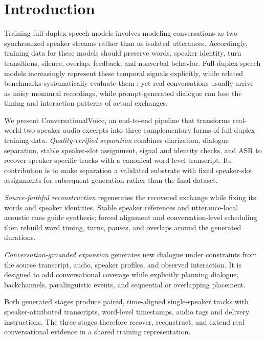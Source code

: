 \documentclass[10pt,twocolumn]{article}
\newcommand{\system}{\textsf{ConversationalVoice}\xspace}
\begin{document}
\section{Introduction}

Training full-duplex speech models involves modeling conversations as two synchronized speaker streams rather than as isolated utterances. Accordingly, training data for these models should preserve words, speaker identity, turn transitions, silence, overlap, feedback, and nonverbal behavior. Full-duplex speech models increasingly represent these temporal signals explicitly, while related benchmarks systematically evaluate them \citep{nguyen2022dgslm,defossez2024moshi,lin2025fullbench}; yet real conversations usually arrive as noisy monaural recordings, while prompt-generated dialogue can lose the timing and interaction patterns of actual exchanges.

We present \system, an end-to-end pipeline that transforms real-world two-speaker audio excerpts into three complementary forms of full-duplex training data. \emph{Quality-verified separation} combines diarization, dialogue separation, stable speaker-slot assignment, signal and identity checks, and ASR to recover speaker-specific tracks with a canonical word-level transcript. Its contribution is to make separation a validated substrate with fixed speaker-slot assignments for subsequent generation rather than the final dataset.

\emph{Source-faithful reconstruction} regenerates the recovered exchange while fixing its words and speaker identities. Stable speaker references and utterance-local acoustic cues guide synthesis; forced alignment and conversation-level scheduling then rebuild word timing, turns, pauses, and overlaps around the generated durations.

\emph{Conversation-grounded expansion} generates new dialogue under constraints from the source transcript, audio, speaker profiles, and observed interaction. It is designed to add conversational coverage while explicitly planning dialogue, backchannels, paralinguistic events, and sequential or overlapping placement.

Both generated stages produce paired, time-aligned single-speaker tracks with speaker-attributed transcripts, word-level timestamps, audio tags and delivery instructions. The three stages therefore recover, reconstruct, and extend real conversational evidence in a shared training representation.
\end{document}
